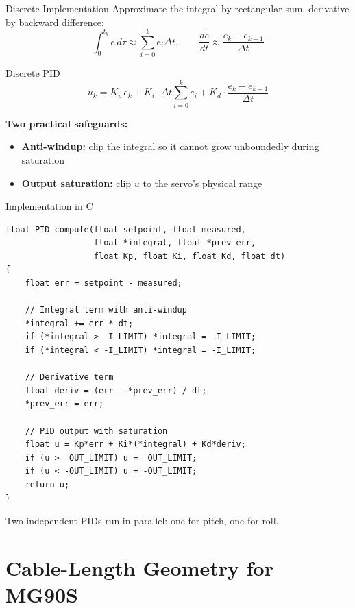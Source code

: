 \documentclass[10pt]{beamer}
\begin{document}
\begin{frame}{Discrete Implementation}
  Approximate the integral by rectangular sum, derivative by backward difference:
  \[
    \int_0^{t_k} e\,d\tau \approx \sum_{i=0}^{k} e_i \Delta t,
    \qquad
    \frac{de}{dt} \approx \frac{e_k - e_{k-1}}{\Delta t}
  \]

  \begin{block}{Discrete PID}
    \[
      u_k = K_p\, e_k + K_i \cdot \Delta t \sum_{i=0}^{k} e_i + K_d \cdot \frac{e_k - e_{k-1}}{\Delta t}
    \]
  \end{block}

  \textbf{Two practical safeguards:}
  \begin{itemize}
    \item \textbf{Anti-windup:} clip the integral so it cannot grow unboundedly during saturation
    \item \textbf{Output saturation:} clip $u$ to the servo's physical range
  \end{itemize}
\end{frame}

\begin{frame}[fragile]{Implementation in C}
\begin{lstlisting}
float PID_compute(float setpoint, float measured,
                  float *integral, float *prev_err,
                  float Kp, float Ki, float Kd, float dt)
{
    float err = setpoint - measured;

    // Integral term with anti-windup
    *integral += err * dt;
    if (*integral >  I_LIMIT) *integral =  I_LIMIT;
    if (*integral < -I_LIMIT) *integral = -I_LIMIT;

    // Derivative term
    float deriv = (err - *prev_err) / dt;
    *prev_err = err;

    // PID output with saturation
    float u = Kp*err + Ki*(*integral) + Kd*deriv;
    if (u >  OUT_LIMIT) u =  OUT_LIMIT;
    if (u < -OUT_LIMIT) u = -OUT_LIMIT;
    return u;
}
\end{lstlisting}

  \scriptsize
  Two independent PIDs run in parallel: one for pitch, one for roll.
\end{frame}

\section{Cable-Length Geometry for MG90S}
\end{document}

